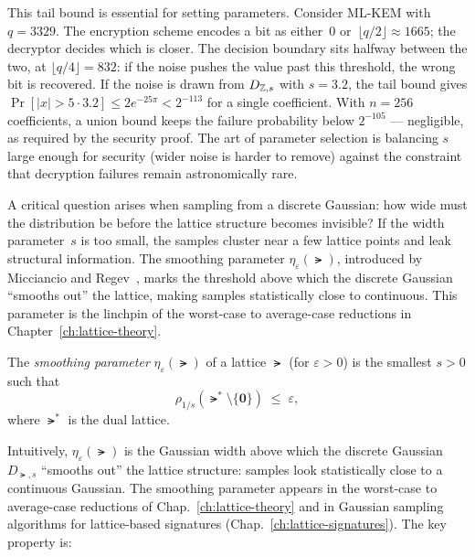 This tail bound is essential for setting parameters.  Consider ML-KEM with $q = 3329$.  The encryption scheme encodes a bit as either~$0$ or~$\lfloor q/2 \rfloor \approx 1665$; the decryptor decides which is closer.  The decision boundary sits halfway between the two, at $\lfloor q/4 \rfloor = 832$: if the noise pushes the value past this threshold, the wrong bit is recovered.  If the noise is drawn from $D_{\mathbb{Z}, s}$ with $s = 3.2$, the tail bound gives $\Pr[|x| > 5 \cdot 3.2] \leq 2e^{-25\pi} < 2^{-113}$ for a single coefficient.  With $n = 256$ coefficients, a union bound keeps the failure probability below $2^{-105}$ --- negligible, as required by the security proof.  The art of parameter selection is balancing $s$ large enough for security (wider noise is harder to remove) against the constraint that decryption failures remain astronomically rare.

A critical question arises when sampling from a discrete Gaussian: how wide must the distribution be before the lattice structure becomes invisible?  If the width parameter~$s$ is too small, the samples cluster near a few lattice points and leak structural information.  The smoothing parameter $\eta_\varepsilon(\lat)$, introduced by Micciancio and Regev~\cite{MicciancioRegev2007}, marks the threshold above which the discrete Gaussian ``smooths out'' the lattice, making samples statistically close to continuous.  This parameter is the linchpin of the worst-case to average-case reductions in Chapter~\ref{ch:lattice-theory}.

\begin{definition}
\label{def:smoothing}
The \emph{smoothing parameter} $\eta_\varepsilon(\lat)$ of a lattice $\lat$ (for $\varepsilon > 0$) is the smallest $s > 0$ such that
\begin{equation}
\label{eq:smoothing}
\rho_{1/s}(\lat^* \setminus \{\mathbf{0}\}) \;\leq\; \varepsilon,
\end{equation}
where $\lat^*$ is the dual lattice.
\end{definition}

Intuitively, $\eta_\varepsilon(\lat)$ is the Gaussian width above which the discrete Gaussian $D_{\lat,s}$ ``smooths out'' the lattice structure: samples look statistically close to a continuous Gaussian.  The smoothing parameter appears in the worst-case to average-case reductions of Chap.~\ref{ch:lattice-theory} and in Gaussian sampling algorithms for lattice-based signatures (Chap.~\ref{ch:lattice-signatures}).  The key property is:

